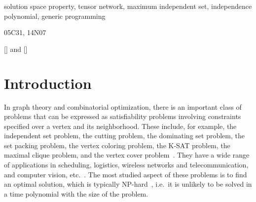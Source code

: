 \documentclass[onefignum, onetabnum]{siamart190516}
\newcommand{\<}{\langle}
\renewcommand{\>}{\rangle}
\newcommand{\blue}[1]{[{\bf  \color{blue}{JG: #1}}]}
\newcommand{\cyan}[1]{[{\bf  \color{cyan}{ML: #1}}]}
\newcommand{\xcyan}[1]{[{\bf  \color{cyan}{\sout{ML: #1}}}]}
\newcounter{example}
\begin{document}
\begin{keywords}
solution space property, tensor network, maximum independent set, independence polynomial, generic programming
\end{keywords}

\begin{AMS}
  05C31, 14N07
\end{AMS}


\cyan{a comment} and \xcyan{a resolved comment}

\section{Introduction}
In graph theory and combinatorial optimization, there is an important class of problems that can be expressed as satisfiability problems involving constraints specified over %
a vertex and its neighborhood. These include, for example, the independent set problem, the cutting problem, the dominating set problem, the set packing problem, the vertex coloring problem, the K-SAT problem,
the maximal clique problem, and the vertex cover problem~\cite{Moore2011}.
They have a wide range of applications in scheduling, logistics,
wireless networks and telecommunication, and computer vision, etc.~\cite{Butenko2003, Wu2015}.
The most studied aspect of these problems is to find an optimal solution, 
which is typically 
NP-hard~\cite{Hastad1996}, i.e.\ it is unlikely to be solved in a time polynomial with the size of the problem.

\end{document}
